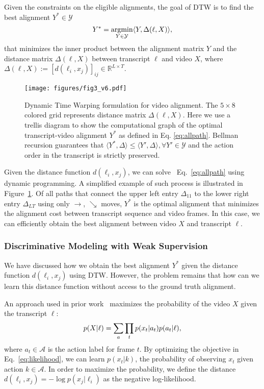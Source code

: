 \documentclass[10pt,twocolumn,letterpaper]{article}
\newcommand{\eqnref}[1]{{Eq.\ \eqref{eq:#1}}}
\begin{document}
Given the constraints on the eligible alignments, the goal of DTW is to find the best alignment $Y^* \in \mathcal{Y}$ 
\begin{equation}
\vspace{-1mm}
\label{eq:allpath}
\small
Y^{*} = \underset{Y \in \mathcal{Y}}{\mathrm{argmin}} \langle Y, \Delta(\ell, X) \rangle,
\end{equation}
that minimizes the inner product between the alignment matrix $Y$ and the distance matrix $\Delta(\ell, X)$ between transcript $\ell$ and video $X$, where $\Delta (\ell, X) := [d(\ell_i, x_j)]_{ij} \in \mathbb{R}^{L\times T}$.

\begin{figure}[tb]
\centering
   \texttt{[image: figures/fig3\_v6.pdf]}
  \caption{
  Dynamic Time Warping formulation for video alignment.  The $5\times8$ colored grid represents distance matrix $\Delta(\ell, X)$. Here we use a trellis diagram to show the computational graph of the optimal transcript-video alignment $Y^*$ as defined in Eq. \eqref{eq:allpath}. Bellman recursion guarantees that $\langle Y^*, \Delta \rangle \le \langle Y', \Delta \rangle, \forall Y' \in \mathcal{Y}$ and the action order in the transcript is strictly preserved.
  }
   \vspace{-1mm}
\label{fig:fig3}
\end{figure}

Given the distance function $d(\ell_i, x_j)$, we can solve ~\eqnref{allpath} using dynamic programming. A simplified example of such process is illustrated in Figure~\ref{fig:fig3}. Of all paths that connect the upper left entry $\Delta_{11}$ to the lower right entry $\Delta_{LT}$ using only $\longrightarrow$, $\searrow$ moves, $Y^*$ is the optimal alignment that minimizes the alignment cost between transcript sequence and video frames. In this case, we can efficiently obtain the best alignment between video $X$ and transcript $\ell$.


\subsubsection{Discriminative Modeling with Weak Supervision}
We have discussed how we obtain the best alignment $Y^*$ given the distance function $d(\ell_i, x_j)$ using DTW. However, 
the problem remains that how can we learn this distance function without access to the ground truth alignment.

An approach used in prior work~\cite{huang2016connectionist,richard2017weakly,richard2018neuralnetwork} maximizes the probability of the video $X$ given the transcript $\ell$:
\begin{equation}
\vspace{-1mm}
\label{eq:likelihood}
\small
    p(X|\ell) = \sum_a \prod_t p(x_t|a_t) p(a_t|\ell),
\end{equation}
where $a_t \in \mathcal{A}$ is the action label for frame $t$. By optimizing the objective in \eqnref{likelihood}, we can learn $p(x_t|k)$, the probability of observing $x_t$ given action $k \in \mathcal{A}$. In order to maximize the probability, we define the distance $d(\ell_i, x_j) = -\log p(x_j|\ell_i)$ as the negative log-likelihood.
\end{document}
